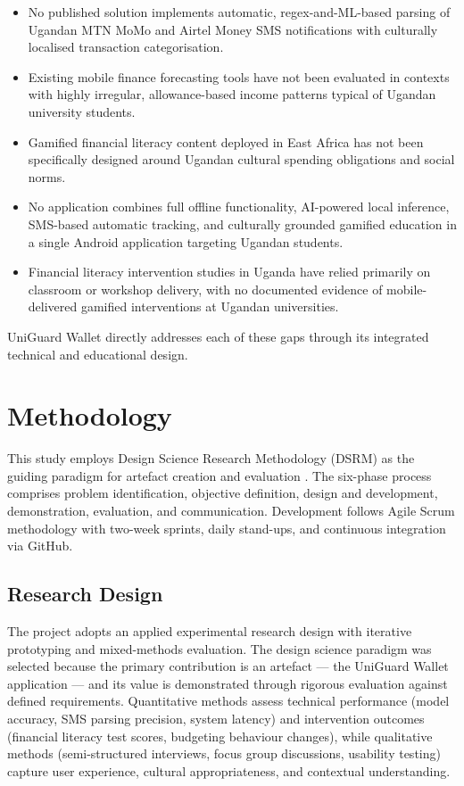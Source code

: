 \documentclass[12pt]{report}
\begin{document}
\begin{itemize}
    \item No published solution implements automatic, regex-and-ML-based parsing of Ugandan MTN MoMo and Airtel Money SMS notifications with culturally localised transaction categorisation.
    \item Existing mobile finance forecasting tools have not been evaluated in contexts with highly irregular, allowance-based income patterns typical of Ugandan university students.
    \item Gamified financial literacy content deployed in East Africa has not been specifically designed around Ugandan cultural spending obligations and social norms.
    \item No application combines full offline functionality, AI-powered local inference, SMS-based automatic tracking, and culturally grounded gamified education in a single Android application targeting Ugandan students.
    \item Financial literacy intervention studies in Uganda have relied primarily on classroom or workshop delivery, with no documented evidence of mobile-delivered gamified interventions at Ugandan universities.
\end{itemize}

UniGuard Wallet directly addresses each of these gaps through its integrated technical and educational design.



\chapter{Methodology}
\label{ch:chapter-03}
This study employs Design Science Research Methodology (DSRM) as the guiding
paradigm for artefact creation and evaluation \citep{Peffers2007}. The six-phase
process comprises problem identification, objective definition, design and development,
demonstration, evaluation, and communication. Development follows Agile Scrum
methodology with two-week sprints, daily stand-ups, and continuous integration via
GitHub.

\section{Research Design}

The project adopts an applied experimental research design with iterative prototyping
and mixed-methods evaluation. The design science paradigm was selected because the
primary contribution is an artefact --- the UniGuard Wallet application --- and its value
is demonstrated through rigorous evaluation against defined requirements. Quantitative
methods assess technical performance (model accuracy, SMS parsing precision, system
latency) and intervention outcomes (financial literacy test scores, budgeting behaviour
changes), while qualitative methods (semi-structured interviews, focus group
discussions, usability testing) capture user experience, cultural appropriateness, and
contextual understanding.
\end{document}
